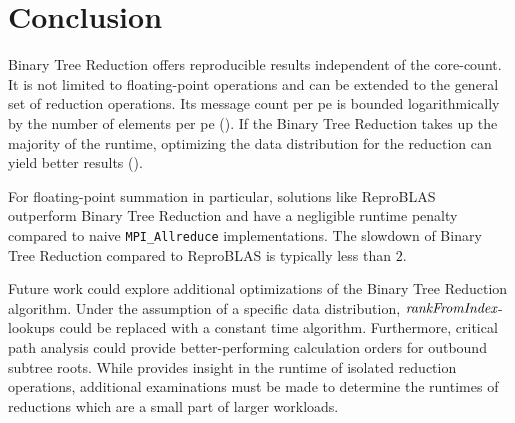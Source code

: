 
\chapter{Conclusion}
\label{ch:Conclusion}

Binary Tree Reduction offers reproducible results independent of the core-count.
It is not limited to floating-point operations and can be extended to the general set of reduction operations.
Its message count per \gls{pe} is bounded logarithmically by the number of elements per \gls{pe} ().
If the Binary Tree Reduction takes up the majority of the runtime, optimizing the data distribution for the reduction can yield better results ().

For floating-point summation in particular, solutions like ReproBLAS~\cite{ahrens_algorithms_2020} outperform Binary Tree Reduction and have a negligible runtime penalty compared to naive \texttt{MPI\_Allreduce} implementations.
The slowdown of Binary Tree Reduction compared to ReproBLAS is typically less than $2$.

Future work could explore additional optimizations of the Binary Tree Reduction algorithm.
Under the assumption of a specific data distribution, $\textit{rankFromIndex}$-lookups could be replaced with a constant time algorithm.
Furthermore, critical path analysis could provide better-performing calculation orders for outbound subtree roots.
While  provides insight in the runtime of isolated reduction operations, additional examinations must be made to determine the runtimes of reductions which are a small part of larger workloads.
